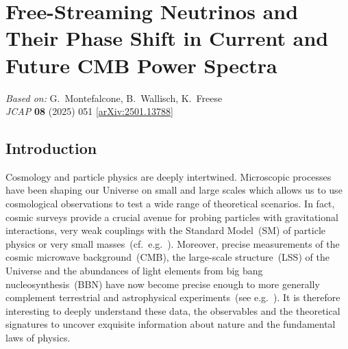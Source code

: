 \chapter[Free-Streaming Neutrinos and Their Phase Shift in CMB Power Spectra]{Free-Streaming Neutrinos and Their Phase Shift in Current and Future CMB Power Spectra}
\label{ch:neutrino-phase-shift}

\begin{center}
\textit{Based on:} G.~Montefalcone, B.~Wallisch, K.~Freese\\
\textit{JCAP} \textbf{08} (2025) 051
[\href{https://arxiv.org/abs/2501.13788}{arXiv:2501.13788}]
\end{center}
\vspace{1em}

\renewcommand{\d}{\mathrm{d}}
\providecommand{\ee}{\mathrm{e}}
\providecommand{\As}{A_\mathrm{s}}
\providecommand{\ns}{n_\mathrm{s}}
\providecommand{\Neff}{N_\mathrm{eff}}
\providecommand{\Nphase}{N_\mathrm{eff}^{\delta\phi}}
\providecommand{\Nmultipole}{N_\mathrm{eff}^{\delta\ell}}


\section{Introduction}
\label{ch12-sec:introduction}

Cosmology and particle physics are deeply intertwined. Microscopic processes have been shaping our Universe on small and large scales which allows us to use cosmological observations to test a wide range of theoretical scenarios. In fact, cosmic surveys provide a crucial avenue for probing particles with gravitational interactions, very weak couplings with the Standard Model~(SM) of particle physics or very small masses~(cf.~e.g.~\cite{Flauger:2022hie, Amin:2022soj, Green:2022hhj}). Moreover, precise measurements of the cosmic microwave background~(CMB), the large-scale structure~(LSS) of the Universe and the abundances of light elements from big bang nucleosynthesis~(BBN) have now become precise enough to more generally complement terrestrial and astrophysical experiments~(see e.g.~\cite{Annis:2022xgg, Chang:2022lrw}). It is therefore interesting to deeply understand these data, the observables and the theoretical signatures to uncover exquisite information about nature and the fundamental laws of physics.\medskip

